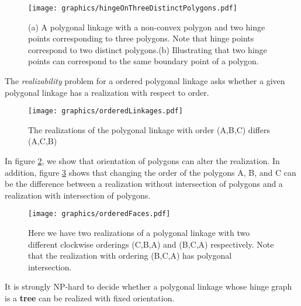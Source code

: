 \begin{figure}[!htbp]
\begin{center}
\texttt{[image: graphics/hingeOnThreeDistinctPolygons.pdf]}
\end{center} 
\caption{(a) A polygonal linkage with a non-convex polygon and two hinge points corresponding to 
three polygons.  Note that hinge points correspond to two distinct polygons.(b) Illustrating that 
two hinge points can correspond to the same boundary point of a polygon.}
\label{fig:linkage-1}
\end{figure}

\begin{prob}\label{problem:OrderedPolygonal}
The \emph{realizability} problem for a ordered polygonal linkage asks whether a given polygonal 
linkage has a realization with respect to order.
\end{prob}

\begin{figure}[!htbp]\label{fig:orderedLinkages}
\begin{center}
\texttt{[image: graphics/orderedLinkages.pdf]}
\end{center} 
\caption{The realizations of the polygonal linkage with order (A,B,C) differs (A,C,B)}
\end{figure}
In figure \ref{fig:orderedLinkages}, we show that orientation of polygons can alter the realization.  In addition, figure \ref{fig:orderedFaces.pdf} shows that changing the order of the polygons A, B, and C can be the difference between a realization without intersection of polygons and a realization with intersection of polygons.
\newpage
\begin{figure}[!htbp]\label{fig:orderedFaces.pdf}
\begin{center}
\texttt{[image: graphics/orderedFaces.pdf]}
\caption{Here we have two realizations of a polygonal linkage with two different clockwise orderings (C,B,A) and (B,C,A) respectively.  Note that the realization with ordering (B,C,A) has polygonal intersection.}
\end{center} 

\end{figure}

\newpage


\begin{thm}\label{thm:hinge2}
It is strongly NP-hard to decide whether a polygonal linkage whose hinge graph is a \textbf{tree} can be realized with fixed orientation.
\end{thm}


